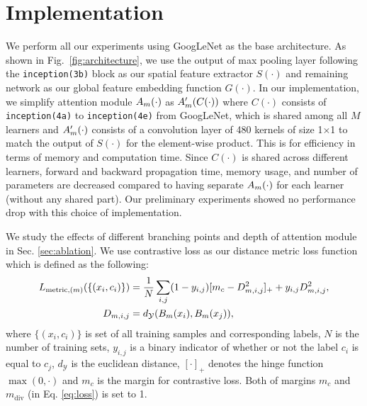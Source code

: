 \documentclass[runningheads]{llncs}
\begin{document}
\vspace{-4mm}
\section{Implementation}
\label{sec:implementation}
\vspace{-2mm}



We perform all our experiments using GoogLeNet \cite{Szegedy_2015_CVPR} as the base architecture. 
As shown in Fig.~\ref{fig:architecture}, 
we use the output of max pooling layer following the \texttt{inception(3b)} block as our spatial feature extractor $S(\cdot)$ and remaining network as our global feature embedding function $G(\cdot)$.
In our implementation, we simplify attention module $A_m(\cdot)$ as $A_m'(C(\cdot))$ where $C(\cdot)$ consists of \texttt{inception(4a)} to \texttt{inception(4e)} from GoogLeNet, which is shared among all $M$ learners and $A_m'(\cdot)$ consists of a convolution layer of 480 kernels of size 1$\times$1 to match the output of $S(\cdot)$ for the element-wise product.
This is for efficiency
in terms of memory and computation time. Since $C(\cdot)$ is shared across
different learners, forward and backward propagation time,
memory usage, and number of parameters are decreased compared to having separate $A_m(\cdot)$ for each learner
(without any shared part). Our preliminary experiments showed no performance drop with this choice of implementation.

We study the effects of different branching points and depth of attention module in Sec. \ref{sec:ablation}.
We use contrastive loss \cite{hadsell2006dimensionality,bell2015learning,chopra2005learning} as our distance metric loss function which is defined as the following:
\vspace{-2mm}
\begin{equation}
\begin{aligned}
L_{\mathrm{metric}, (\ensemblesub)}(\{(x_i,c_i)\}) &  = \frac{1}{N}\sum_{i,j} (1-y_{i,j})[m_{c}-D_{\ensemblesub,i,j}^2]_+ + y_{i,j} D_{\ensemblesub,i,j}^2, \\
D_{\ensemblesub,i,j} & =d_{\mathcal{Y}}(\Ensemblefunc_\ensemblesub(x_i), \Ensemblefunc_\ensemblesub(x_j)),
\end{aligned}
\label{eq:metricloss}
\vspace{-2mm}
\end{equation}
where $\{(x_i,c_i)\}$ is set of all training samples and corresponding labels, $N$ is the number of training sets, $y_{i,j}$ is a binary indicator of whether or not the label $c_i$ is equal to $c_j$, $d_{\mathcal{Y}}$ is the euclidean distance, $[\cdot]_+$ denotes the hinge function $\max(0,\cdot)$ and $m_{c}$ is the margin for contrastive loss. Both of margins $m_{c}$ and $m_\mathrm{div}$ (in Eq. \ref{eq:loss}) is set to 1.
\end{document}
